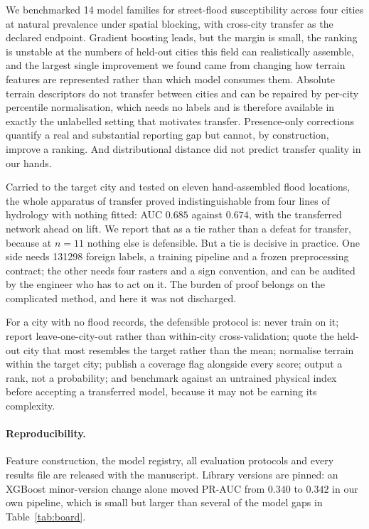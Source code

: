 \documentclass[11pt]{article}
\begin{document}
We benchmarked \num{14} model families for street-flood susceptibility across
four cities at natural prevalence under spatial blocking, with cross-city
transfer as the declared endpoint. Gradient boosting leads, but the margin is
small, the ranking is unstable at the numbers of held-out cities this field can
realistically assemble, and the largest single improvement we found came from
changing how terrain features are represented rather than which model consumes
them. Absolute terrain descriptors do not transfer between cities and can be
repaired by per-city percentile normalisation, which needs no labels and is
therefore available in exactly the unlabelled setting that motivates transfer.
Presence-only corrections quantify a real and substantial reporting gap but
cannot, by construction, improve a ranking. And distributional distance did not
predict transfer quality in our hands.

Carried to the target city and tested on eleven hand-assembled flood locations,
the whole apparatus of transfer proved indistinguishable from four lines of
hydrology with nothing fitted: AUC $0.685$ against $0.674$, with the transferred
network ahead on lift. We report that as a tie rather than a defeat for
transfer, because at $n{=}11$ nothing else is defensible. But a tie is decisive
in practice. One side needs \num{131298} foreign labels, a training pipeline and
a frozen preprocessing contract; the other needs four rasters and a sign
convention, and can be audited by the engineer who has to act on it. The
burden of proof belongs on the complicated method, and here it was not
discharged.

For a city with no flood records, the defensible protocol is: never train on it;
report leave-one-city-out rather than within-city cross-validation; quote the
held-out city that most resembles the target rather than the mean; normalise
terrain within the target city; publish a coverage flag alongside every score;
output a rank, not a probability; and benchmark against an untrained physical
index before accepting a transferred model, because it may not be earning its
complexity.

\paragraph{Reproducibility.} Feature construction, the model registry, all
evaluation protocols and every results file are released with the manuscript.
Library versions are pinned: an XGBoost minor-version change alone moved PR-AUC
from $0.340$ to $0.342$ in our own pipeline, which is small but larger than
several of the model gaps in Table~\ref{tab:board}.
\end{document}

